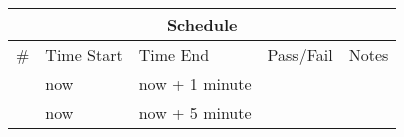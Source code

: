 \documentclass{article}
\begin{document}
\begin{enumerate}
	\vspace{0.25in}
	\begin{tabular}{|l|l|l|l|l|}
		\hline
		\multicolumn{5}{|c|}{Schedule} \\
		\hline
		\# & Time Start & Time End & Pass/Fail & \hspace{0.5in}Notes\hspace{0.5in} \\
		\hline
		& now & now + 1 minute & & \\
		\hline
		& now & now + 5 minute & & \\
		\hline
	\end{tabular}

\end{enumerate}

\end{document}
